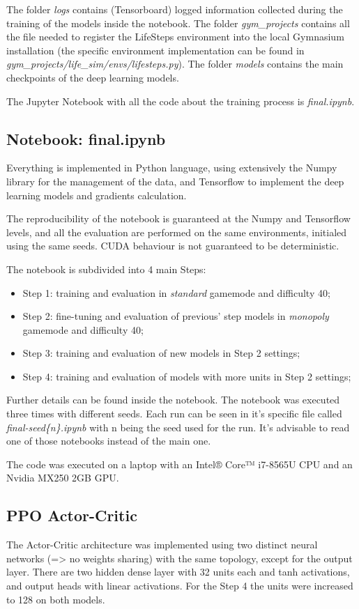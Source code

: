 \documentclass{article}
\begin{document}
The folder \textit{logs} contains (Tensorboard) logged information collected during the training of the models inside the notebook. The folder \textit{gym\_projects} contains all the file needed to register the LifeSteps environment into the local Gymnasium installation (the specific environment implementation can be found in \textit{gym\_projects/life\_sim/envs/lifesteps.py}). The folder \textit{models} contains the main checkpoints of the deep learning models.

The Jupyter Notebook with all the code about the training process is \textit{final.ipynb}.

\subsection{Notebook: final.ipynb}
Everything is implemented in Python language, using extensively the Numpy library for the management of the data, and Tensorflow to implement the deep learning models and gradients calculation.

The reproducibility of the notebook is guaranteed at the Numpy and Tensorflow levels, and all the evaluation are performed on the same environments, initialed using the same seeds. CUDA behaviour is not guaranteed to be deterministic.

The notebook is subdivided into 4 main Steps:
\begin{itemize}
    \item Step 1: training and evaluation in \textit{standard} gamemode and difficulty 40;
    \item Step 2: fine-tuning and evaluation of previous' step models in \textit{monopoly} gamemode and difficulty 40;
    \item Step 3: training and evaluation of new models in Step 2 settings;
    \item Step 4: training and evaluation of models with more units in Step 2 settings;
\end{itemize}

Further details can be found inside the notebook. The notebook was executed three times with different seeds. Each run can be seen in it's specific file called \textit{final-seed\{n\}.ipynb} with n being the seed used for the run. It's advisable to read one of those notebooks instead of the main one.

The code was executed on a laptop with an Intel® Core™ i7-8565U CPU and an Nvidia MX250 2GB GPU.


\subsection{PPO Actor-Critic}
The Actor-Critic architecture was implemented using two distinct neural networks (=> no weights sharing) with the same topology, except for the output layer. There are two hidden dense layer with 32 units each and tanh activations, and output heads with linear activations. For the Step 4 the units were increased to 128 on both models.
\end{document}
